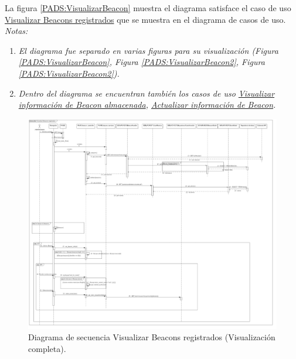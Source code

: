 La figura \ref{PADS:VisualizarBeacon} muestra el diagrama satisface el caso de uso \hyperlink{casosdeusoPA}{Visualizar Beacons registrados} que se muestra en el diagrama de casos de uso. \\
\textit{Notas:}
\begin{enumerate}
\item \textit{El diagrama fue separado en varias figuras para su visualización (Figura \ref{PADS:VisualizarBeacon}, Figura \ref{PADS:VisualizarBeacon2}, Figura \ref{PADS:VisualizarBeacon2}).}
\item \textit{Dentro del diagrama se encuentran también los casos de uso \hyperlink{casosdeusoPA}{Visualizar información de Beacon almacenada}, \hyperlink{casosdeusoPA}{Actualizar información de Beacon}.} 
\end{enumerate}

\FloatBarrier
\begin{figure}[htbp!]
		\centering
			\includegraphics[width=1 \textwidth]{imagenes/DSRuben/beacons}
		\caption{Diagrama de secuencia Visualizar Beacons registrados (Visualización completa).}
		\label{PADS:VisualizarAnuncio}
\end{figure}
\FloatBarrier



